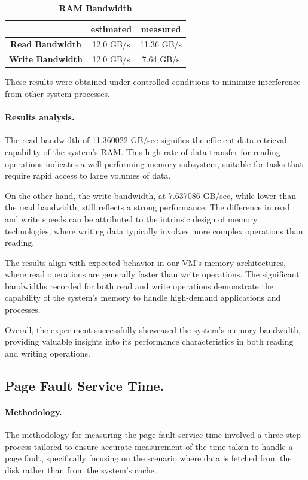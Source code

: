 \begin{table}[h]
	\centering
	\begin{tabular}{c|c|c}
		\hline
		\makecell{Type} & estimated & measured\\ \hline
        \textbf{Read Bandwidth} &  12.0 GB/s & 11.36 GB/s  \\ \hline
        \textbf{Write Bandwidth} & 12.0 GB/s & 7.64 GB/s  \\ \hline
	\end{tabular}
	\caption{\textbf{RAM Bandwidth}}
	\label{table:ram-band}
\end{table}

These results were obtained under controlled conditions to minimize interference from other system processes.

\paragraph{Results analysis.}
The read bandwidth of 11.360022 GB/sec signifies the efficient data retrieval capability of the system's RAM. This high rate of data transfer for reading operations indicates a well-performing memory subsystem, suitable for tasks that require rapid access to large volumes of data.

On the other hand, the write bandwidth, at 7.637086 GB/sec, while lower than the read bandwidth, still reflects a strong performance. The difference in read and write speeds can be attributed to the intrinsic design of memory technologies, where writing data typically involves more complex operations than reading.

The results align with expected behavior in our VM's memory architectures, where read operations are generally faster than write operations. The significant bandwidths recorded for both read and write operations demonstrate the capability of the system's memory to handle high-demand applications and processes.

Overall, the experiment successfully showcased the system's memory bandwidth, providing valuable insights into its performance characteristics in both reading and writing operations.

\subsection{Page Fault Service Time.}
\paragraph{Methodology.}
The methodology for measuring the page fault service time involved a three-step process tailored to ensure accurate measurement of the time taken to handle a page fault, specifically focusing on the scenario where data is fetched from the disk rather than from the system's cache.

